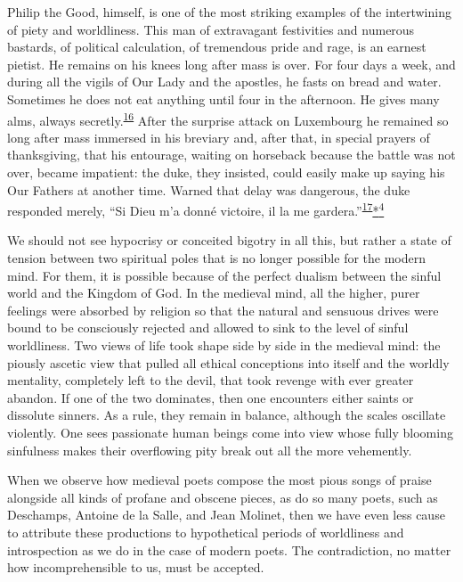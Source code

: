 Philip the Good, himself, is one of the most striking examples of the
intertwining of piety and worldliness. This man of extravagant
festivities and numerous bastards, of political calculation, of
tremendous pride and rage, is an earnest pietist. He remains on his
knees long after mass is over. For four days a week, and during all the
vigils of Our Lady and the apostles, he fasts on bread and water.
Sometimes he does not eat anything until four in the afternoon. He gives
many alms, always
secretly.\textsuperscript{\protect\hypertarget{14_Chapter_Seven__THE_PIOUS_PERSONA.xhtmlux5cux23id_992}{\protect\hyperlink{23_NOTES.xhtmlux5cux23id_993}{16}}}
After the surprise attack on Luxembourg he remained so long after mass
immersed in his breviary and, after that, in special prayers of
thanksgiving, that his entourage, waiting on horseback because the
battle was not over, became impatient: the duke, they insisted, could
easily make up saying his Our Fathers at another time. Warned that delay
was dangerous, the duke responded merely, ``Si Dieu m'a donné victoire,
il la me
gardera.''\textsuperscript{\protect\hypertarget{14_Chapter_Seven__THE_PIOUS_PERSONA.xhtmlux5cux23id_990}{\protect\hyperlink{23_NOTES.xhtmlux5cux23id_991}{17}}}\protect\hypertarget{14_Chapter_Seven__THE_PIOUS_PERSONA.xhtmlux5cux23id_2547}{\protect\hyperlink{23_NOTES.xhtmlux5cux23id_2548}{*\textsuperscript{4}}}

We should not see hypocrisy or conceited bigotry in all this, but rather
a state of tension between two spiritual poles that is no longer
possible for the modern mind. For them, it is possible because of the
perfect dualism between the sinful world and the Kingdom of God. In the
medieval mind, all the higher, purer feelings were absorbed by religion
so that the natural and sensuous drives were bound to be consciously
rejected and allowed to sink to the level of sinful worldliness. Two
views of life took shape side by side in the medieval mind: the piously
ascetic view that pulled all ethical conceptions into itself and the
worldly mentality, completely left to the devil, that took revenge with
ever greater abandon. If one of the two dominates, then one encounters
either saints or dissolute sinners. As a rule, they remain in balance,
although the scales oscillate violently. One sees passionate human
beings come into view whose fully blooming sinfulness makes their
overflowing pity break out all the more vehemently.

When we observe how medieval poets compose the most pious songs of
praise alongside all kinds of profane and obscene pieces,
\protect\hypertarget{14_Chapter_Seven__THE_PIOUS_PERSONA.xhtmlux5cux23page_208}{}{}as
do so many poets, such as Deschamps, Antoine de la Salle, and Jean
Molinet, then we have even less cause to attribute these productions to
hypothetical periods of worldliness and introspection as we do in the
case of modern poets. The contradiction, no matter how incomprehensible
to us, must be accepted.


